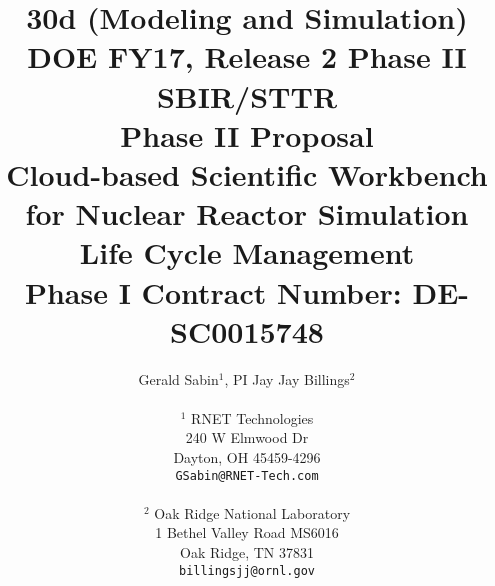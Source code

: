 \title{30d (Modeling and Simulation)\\
DOE FY17, Release 2 Phase II SBIR/STTR \\
\vspace{0.25in}Phase II Proposal\\
\vspace{0.25in} Cloud-based Scientific Workbench for Nuclear Reactor Simulation 
Life Cycle Management\\
Phase I Contract Number: DE-SC0015748
\vspace{0.15in}}
\author{Gerald Sabin$^1$, PI \hspace{0.75in} Jay Jay Billings$^2$\\
  \\$^1$ RNET Technologies\\
  240 W Elmwood Dr\\
  Dayton, OH 45459-4296\\
  {\tt GSabin@RNET-Tech.com}\\\\
  $^2$ Oak Ridge National Laboratory\\
  1 Bethel Valley Road MS6016\\
  Oak Ridge, TN 37831\\
  {\tt billingsjj@ornl.gov}
}


